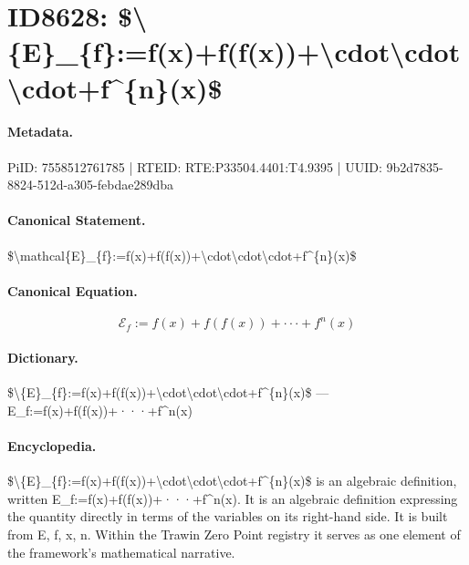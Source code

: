 \section*{ID8628: \$\textbackslash{}\{E\}\_\{f\}:=f(x)+f(f(x))+\textbackslash{}cdot\textbackslash{}cdot\textbackslash{}cdot+f\textasciicircum{}\{n\}(x)\$}
\paragraph{Metadata.}
PiID: 7558512761785 | RTEID: RTE:P33504.4401:T4.9395 | UUID: 9b2d7835-8824-512d-a305-febdae289dba

\paragraph{Canonical Statement.}
\$\textbackslash{}mathcal\{E\}\_\{f\}:=f(x)+f(f(x))+\textbackslash{}cdot\textbackslash{}cdot\textbackslash{}cdot+f\textasciicircum{}\{n\}(x)\$

\paragraph{Canonical Equation.}
\[
\mathcal{E}_{f}:=f(x)+f(f(x))+\cdot\cdot\cdot+f^{n}(x)
\]

\paragraph{Dictionary.}
\$\textbackslash{}\{E\}\_\{f\}:=f(x)+f(f(x))+\textbackslash{}cdot\textbackslash{}cdot\textbackslash{}cdot+f\textasciicircum{}\{n\}(x)\$ — E\_f:=f(x)+f(f(x))+···+f\textasciicircum{}n(x)

\paragraph{Encyclopedia.}
\$\textbackslash{}\{E\}\_\{f\}:=f(x)+f(f(x))+\textbackslash{}cdot\textbackslash{}cdot\textbackslash{}cdot+f\textasciicircum{}\{n\}(x)\$ is an algebraic definition, written E\_f:=f(x)+f(f(x))+···+f\textasciicircum{}n(x). It is an algebraic definition expressing the quantity directly in terms of the variables on its right-hand side. It is built from E, f, x, n. Within the Trawin Zero Point registry it serves as one element of the framework's mathematical narrative.
